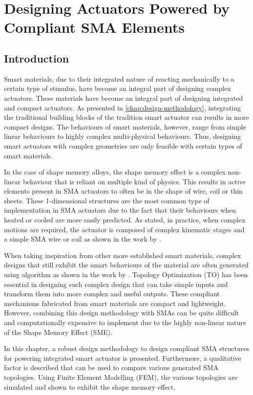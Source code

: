 
\chapter{Designing Actuators Powered by Compliant SMA Elements}\label{chap:compliant-sma}
\section{Introduction}
Smart materials, due to their integrated nature of reacting mechanically to a certain type of stimulus, have become an integral part of designing complex actuators. These materials have become an integral part of designing integrated and compact actuators. As presented in \cref{chap:design-methodology}, integrating the traditional building blocks of the tradition smart actuator can results in more compact designs. The behaviours of smart materials, however, range from simple linear behaviours to highly complex multi-physical behaviours. Thus, designing smart actuators with complex geometries are only feasible with certain types of smart materials.

In the case of shape memory alloys, the shape memory effect is a complex non-linear behaviour that is reliant on multiple kind of physics. This results in active elements present in SMA actuators to often be in the shape of wire, coil or thin sheets. These 1-dimensional structures are the most common type of implementation in SMA actuators due to the fact that their behaviours when heated or cooled are more easily predicted. As stated, in practice, when complex motions are required, the actuator is composed of complex kinematic stages and a simple SMA wire or coil as shown in the work by \todocite.

When taking inspiration from other more established smart materials, complex designs that still exhibit the smart behaviours of the material are often generated using algorithm as shown in the work by \todocite. Topology Optimization (TO) has been essential in designing such complex design that can take simple inputs and transform them into more complex and useful outputs. These compliant mechanisms fabricated from smart materials are compact and lightweight. However, combining this design methodology with SMAs can be quite difficult and computationally expensive to implement due to the highly non-linear nature of the Shape Memory Effect (SME).

In this chapter, a robust design methodology to design compliant SMA structures for powering integrated smart actuator is presented. Furthermore, a qualitative factor is described that can be used to compare various generated SMA topologies. Using Finite Element Modelling (FEM), the various topologies are simulated and shown to exhibit the shape memory effect.

